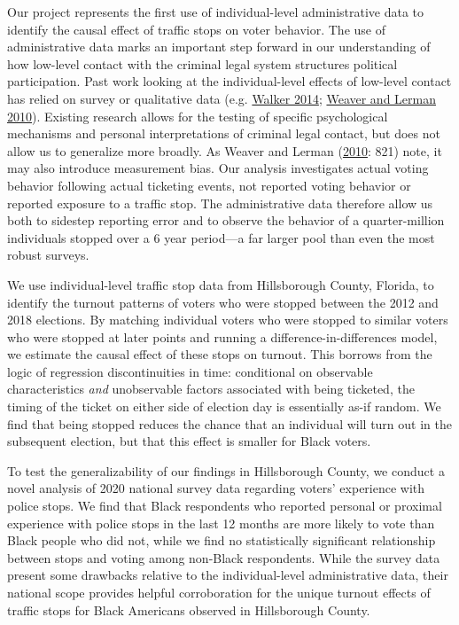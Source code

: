 \documentclass[
  12pt,
]{article}
\begin{document}
Our project represents the first use of individual-level administrative data to identify the causal effect of traffic stops on voter behavior. The use of administrative data marks an important step forward in our understanding of how low-level contact with the criminal legal system structures political participation. Past work looking at the individual-level effects of low-level contact has relied on survey or qualitative data (e.g. \protect\hyperlink{ref-Walker2014}{Walker 2014}; \protect\hyperlink{ref-Weaver2010}{Weaver and Lerman 2010}). Existing research allows for the testing of specific psychological mechanisms and personal interpretations of criminal legal contact, but does not allow us to generalize more broadly. As Weaver and Lerman (\protect\hyperlink{ref-Weaver2010}{2010}: 821) note, it may also introduce measurement bias. Our analysis investigates actual voting behavior following actual ticketing events, not reported voting behavior or reported exposure to a traffic stop. The administrative data therefore allow us both to sidestep reporting error and to observe the behavior of a quarter-million individuals stopped over a 6 year period---a far larger pool than even the most robust surveys.

We use individual-level traffic stop data from Hillsborough County, Florida, to identify the turnout patterns of voters who were stopped between the 2012 and 2018 elections. By matching individual voters who were stopped to similar voters who were stopped at later points and running a difference-in-differences model, we estimate the causal effect of these stops on turnout. This borrows from the logic of regression discontinuities in time: conditional on observable characteristics \emph{and} unobservable factors associated with being ticketed, the timing of the ticket on either side of election day is essentially as-if random. We find that being stopped reduces the chance that an individual will turn out in the subsequent election, but that this effect is smaller for Black voters.

To test the generalizability of our findings in Hillsborough County, we conduct a novel analysis of 2020 national survey data regarding voters' experience with police stops. We find that Black respondents who reported personal or proximal experience with police stops in the last 12 months are more likely to vote than Black people who did not, while we find no statistically significant relationship between stops and voting among non-Black respondents. While the survey data present some drawbacks relative to the individual-level administrative data, their national scope provides helpful corroboration for the unique turnout effects of traffic stops for Black Americans observed in Hillsborough County.
\end{document}
